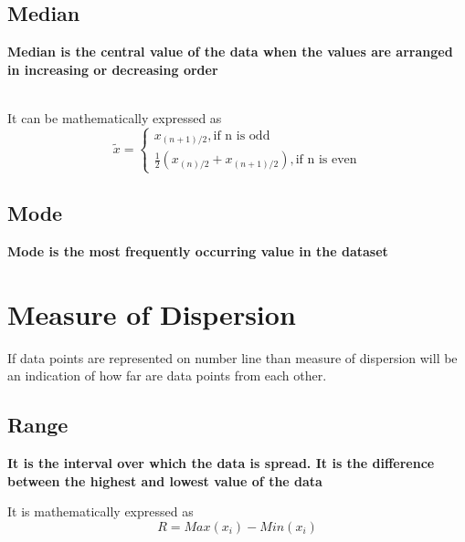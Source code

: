 \documentclass[twoside,12pt]{report}  %
\begin{document}

\subsection{Median}
\begin{tcolorbox}[colback=red!5!white,colframe=red!75!black, title= \textbf{Median}]
	\textbf{Median is the central value of the data when the values are arranged in increasing or decreasing order}
\end{tcolorbox}
\noindent
\\
It can be mathematically expressed as
$$\boxed{\widetilde{x} = \left\{
				   		\begin{array}{ll}
				   			x_{(n+1)/2}, \mbox{if n is odd}                                      \\
				   			\frac{1}{2}\left(x_{(n)/2} + x_{(n+1)/2}\right), \mbox{if n is even}
				   		\end{array}	
                    \right.
}$$


\subsection{Mode}
\begin{tcolorbox}[colback=red!5!white,colframe=red!75!black, title= \textbf{Mode}]
	\textbf{Mode is the most frequently occurring value in the dataset} 
\end{tcolorbox}

\section{Measure of Dispersion}
If data points are represented on number line than measure of dispersion will be an indication of how far are data points from each other. 
\subsection{Range}
\begin{tcolorbox}[colback=red!5!white,colframe=red!75!black, title= \textbf{Range}]
	\textbf{It is the interval over which the data is spread. It is the difference between the highest and lowest value of the data} 
\end{tcolorbox}
\noindent
It is mathematically expressed as
$$ \boxed{R = Max(x_{i}) - Min(x_{i})} $$
\end{document}
